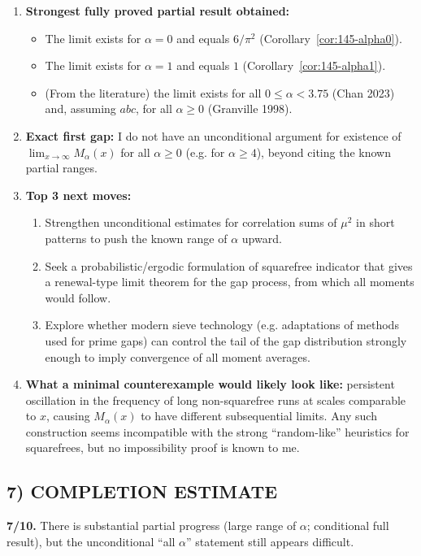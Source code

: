 \begin{enumerate}
\item[(i)] \textbf{Strongest fully proved partial result obtained:}
\begin{itemize}
\item The limit exists for $\alpha=0$ and equals $6/\pi^2$ (Corollary~\ref{cor:145-alpha0}).
\item The limit exists for $\alpha=1$ and equals $1$ (Corollary~\ref{cor:145-alpha1}).
\item (From the literature) the limit exists for all $0\le\alpha<3.75$ (Chan 2023) and, assuming $abc$, for all $\alpha\ge 0$ (Granville 1998).
\end{itemize}
\item[(ii)] \textbf{Exact first gap:} I do not have an unconditional argument for existence of $\lim_{x\to\infty}M_{\alpha}(x)$ for all $\alpha\ge 0$ (e.g. for $\alpha\ge 4$), beyond citing the known partial ranges.
\item[(iii)] \textbf{Top 3 next moves:}
\begin{enumerate}
\item Strengthen unconditional estimates for correlation sums of $\mu^2$ in short patterns to push the known range of $\alpha$ upward.
\item Seek a probabilistic/ergodic formulation of squarefree indicator that gives a renewal-type limit theorem for the gap process, from which all moments would follow.
\item Explore whether modern sieve technology (e.g. adaptations of methods used for prime gaps) can control the tail of the gap distribution strongly enough to imply convergence of all moment averages.
\end{enumerate}
\item[(iv)] \textbf{What a minimal counterexample would likely look like:} persistent oscillation in the frequency of long non-squarefree runs at scales comparable to $x$, causing $M_{\alpha}(x)$ to have different subsequential limits. Any such construction seems incompatible with the strong ``random-like'' heuristics for squarefrees, but no impossibility proof is known to me.
\end{enumerate}

\subsection*{7) COMPLETION ESTIMATE}
\textbf{7/10.} There is substantial partial progress (large range of $\alpha$; conditional full result), but the unconditional ``all $\alpha$'' statement still appears difficult.

